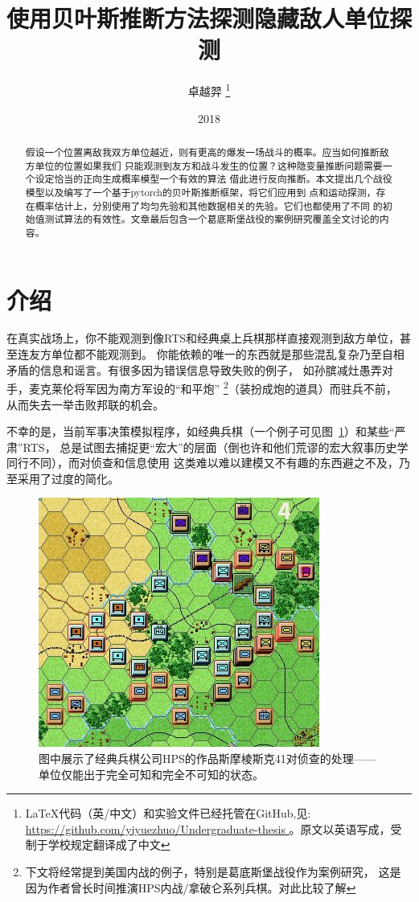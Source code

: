\documentclass{article}
\title{使用贝叶斯推断方法探测隐藏敌人单位探测}
\author{卓越羿 
\footnote{LaTeX代码（英/中文）和实验文件已经托管在GitHub,见: 
\url{ https://github.com/yiyuezhuo/Undergraduate-thesis } 。原文以英语写成，受制于学校规定翻译成了中文}
}
\date{2018}
\begin{document}
\maketitle

\begin{abstract}


假设一个位置离敌我双方单位越近，则有更高的爆发一场战斗的概率。应当如何推断敌方单位的位置如果我们
只能观测到友方和战斗发生的位置？这种隐变量推断问题需要一个设定恰当的正向生成概率模型一个有效的算法
借此进行反向推断。本文提出几个战役模型以及编写了一个基于pytorch的贝叶斯推断框架，将它们应用到
点和运动探测，存在概率估计上，分别使用了均匀先验和其他数据相关的先验。它们也都使用了不同
的初始值测试算法的有效性。文章最后包含一个葛底斯堡战役的案例研究覆盖全文讨论的内容。

\end{abstract}

\tableofcontents


\section{介绍}


在真实战场上，你不能观测到像RTS和经典桌上兵棋那样直接观测到敌方单位，甚至连友方单位都不能观测到。
你能依赖的唯一的东西就是那些混乱复杂乃至自相矛盾的信息和谣言。有很多因为错误信息导致失败的例子，
如孙膑减灶愚弄对手，麦克莱伦将军因为南方军设的“和平炮”
\footnote{下文将经常提到美国内战的例子，特别是葛底斯堡战役作为案例研究，
这是因为作者曾长时间推演HPS内战/拿破仑系列兵棋。对此比较了解}（装扮成炮的道具）而驻兵不前，
从而失去一举击败邦联的机会。

不幸的是，当前军事决策模拟程序，如经典兵棋（一个例子可见图~\ref{fig:hps}）和某些“严肃”RTS，
总是试图去捕捉更“宏大”的层面（倒也许和他们荒谬的宏大叙事历史学同行不同），而对侦查和信息使用
这类难以难以建模又不有趣的东西避之不及，乃至采用了过度的简化。

\begin{figure}[ht]
\includegraphics[width=0.6\linewidth]{SmolenskR4.jpg}
\caption{
图中展示了经典兵棋公司HPS的作品斯摩棱斯克41对侦查的处理——单位仅能出于完全可知和完全不可知的状态。 }
\label{fig:hps}
\end{figure}
\end{document}
